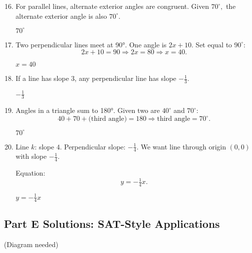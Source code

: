 \documentclass[12pt]{article}
\begin{document}
\begin{enumerate}
  \setcounter{enumi}{15}
  \item For parallel lines, alternate exterior angles are congruent.  
  Given \(70^\circ,\) the alternate exterior angle is also \(70^\circ.\)

  \(\boxed{70^\circ}\)

  \item Two perpendicular lines meet at 90°.  
  One angle is \(2x + 10.\) Set equal to \(90^\circ:\)
  \[
  2x + 10 = 90
  \Rightarrow 2x = 80
  \Rightarrow x = 40.
  \]

  \(\boxed{x = 40}\)

  \item If a line has slope 3, any perpendicular line has slope \(-\tfrac{1}{3}.\)

  \(\boxed{-\tfrac{1}{3}}\)

  \item Angles in a triangle sum to 180°.  
  Given two are \(40^\circ\) and \(70^\circ:\)
  \[
  40 + 70 + \text{(third angle)} = 180
  \Rightarrow \text{third angle} = 70^\circ.
  \]

  \(\boxed{70^\circ}\)

  \item Line \(k\): slope \(4\).  
  Perpendicular slope: \(-\tfrac{1}{4}.\)  
  We want line through origin \((0,0)\) with slope \(-\tfrac{1}{4}.\)

  Equation:
  \[
  y = -\tfrac{1}{4}x.
  \]

  \(\boxed{y = -\tfrac{1}{4}x}\)
\end{enumerate}

\subsection*{Part E Solutions: SAT-Style Applications}
(Diagram needed)
\end{document}
